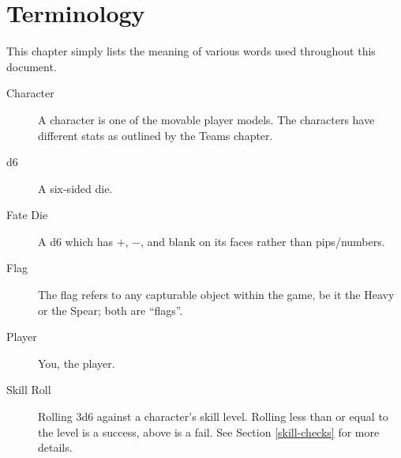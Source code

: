 \chapter{Terminology}
This chapter simply lists the meaning of various words used throughout this document.

\begin{description}
\item[Character] A character is one of the movable player models.
The characters have different stats as outlined by the Teams chapter.
\item[d6] A six-sided die.
\item[Fate Die] A d6 which has $+$, $-$, and blank on its faces rather than pips/numbers.
\item[Flag] The flag refers to any capturable object within the game, be it the Heavy or the Spear; both are ``flags''.
\item[Player] You, the player.
\item[Skill Roll] Rolling 3d6 against a character's skill level.
Rolling less than or equal to the level is a success, above is a fail.
See Section \ref{skill-checks} for more details.
\end{description}